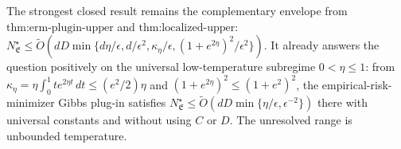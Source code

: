 The strongest closed result remains the complementary envelope from \(\text{thm:erm-plugin-upper}\) and \(\text{thm:localized-upper}\): \(N^\star_{\mathfrak E}\le\widetilde O\!\left(dD\min\{d\eta/\epsilon,d/\epsilon^2,\kappa_\eta/\epsilon,(1+e^{2\eta})^2/\epsilon^2\}\right)\). It already answers the question positively on the universal low-temperature subregime \(0<\eta\le1\): from \(\kappa_\eta=\eta\int_0^1 t e^{2\eta t}\,dt\le(e^2/2)\eta\) and \((1+e^{2\eta})^2\le(1+e^2)^2\), the empirical-risk-minimizer Gibbs plug-in satisfies \(N^\star_{\mathfrak E}\le\widetilde O\!\left(dD\min\{\eta/\epsilon,\epsilon^{-2}\}\right)\) there with universal constants and without using \(C\) or \(D\). The unresolved range is unbounded temperature.